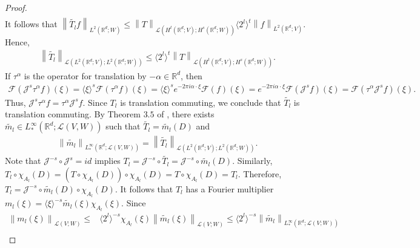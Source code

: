 \documentclass[11pt,letterpaper,reqno]{amsart}
\numberwithin{equation}{section}
\newcommand{\norm}[1]{\left\lVert#1\right\rVert}
\begin{document}
\begin{proof}
\begin{align}
    \end{align}
    It follows that \(\norm{\widetilde{T_{l}}f}_{L^{2}(\mathbb{R}^{d};W)} \leq \norm{T}_{\mathcal{L}(H^{t}(\mathbb{R}^{d};V);H^{s}(\mathbb{R}^{d};W))}\langle 2^{l} \rangle^{t}\norm{f}_{L^{2}(\mathbb{R}^{d};V)}\). Hence,
    \begin{align}
        \norm{\widetilde{T_{l}}}_{\mathcal{L}(L^{2}(\mathbb{R}^{d};V);L^{2}(\mathbb{R}^{d};W))} \leq \langle 2^{l} \rangle^{t}\norm{T}_{\mathcal{L}(H^{t}(\mathbb{R}^{d};V);H^{s}(\mathbb{R}^{d};W))}.
    \end{align}
    If \(\tau^{\alpha}\) is the operator for translation by \(-\alpha \in \mathbb{R}^{d}\), then
    \begin{align}
        \mathcal{F}(\mathcal{J}^{s}\tau^{\alpha}f)(\xi)=\langle \xi\rangle^{s}\mathcal{F}(\tau^{\alpha}f)(\xi)=\langle\xi \rangle^{s}e^{-2\pi i \alpha \cdot \xi}\mathcal{F}(f)(\xi) =e^{-2\pi i \alpha \cdot \xi}\mathcal{F}(\mathcal{J}^{s}f)(\xi)=\mathcal{F}(\tau^{\alpha}\mathcal{J}^{s}f)(\xi).
    \end{align}
    Thus, \(\mathcal{J}^{s}\tau^{\alpha}f = \tau^{\alpha}\mathcal{J}^{s}f\). Since \(T_{l}\) is translation commuting, we conclude that \(\widetilde{T_{l}}\) is translation commuting. By Theorem \(3.5\) of \cite{MR4787851}, there exists \(\widetilde{m_{l}} \in L^{\infty}_{*}(\mathbb{R}^{d};\mathcal{L}(V,W))\) such that \(\widetilde{T_{l}}=\widetilde{m_{l}}(D)\) and
    \begin{align}
        \norm{\widetilde{m_{l}}}_{L^{\infty}_{*}(\mathbb{R}^{d};\mathcal{L}(V,W))}=\norm{\widetilde{T_{l}}}_{\mathcal{L}(L^{2}(\mathbb{R}^{d};V); L^{2}(\mathbb{R}^{d};W))}.
    \end{align}
    Note that  \(\mathcal{J}^{-s}\circ \mathcal{J}^{s}=id\) implies  \(T_{l}=\mathcal{J}^{-s}\circ \widetilde{T_{l}}=\mathcal{J}^{-s}\circ \widetilde{m_{l}}(D)\). Similarly,  $T_{l} \circ \chi_{A_{l}}(D)   = (T \circ \chi_{A_{l}}(D))\circ \chi_{A_{l}}(D)   =T \circ \chi_{A_{l}}(D)   = T_{l}$. Therefore, \(T_{l}=\mathcal{J}^{-s}\circ \widetilde{m_{l}}(D) \circ \chi_{A_{l}}(D)\). It follows that \(T_{l}\) has a Fourier multiplier \(m_{l}(\xi)=\langle \xi\rangle^{-s}\widetilde{m_{l}}(\xi)\chi_{A_{l}}(\xi)\). Since
    \begin{align}
        \norm{m_{l}(\xi)}_{\mathcal{L}(V;W)}\leq& \langle 2^{l} \rangle^{-s}\chi_{A_{l}}(\xi)\norm{\widetilde{m_{l}}(\xi)}_{\mathcal{L}(V;W)} \leq \langle 2^{l} \rangle^{-s} \norm{\widetilde{m_{l}}}_{L^{\infty}_{*}(\mathbb{R}^{d};\mathcal{L}(V;W))} \nonumber\\

\end{align}
\end{proof}
\end{document}
